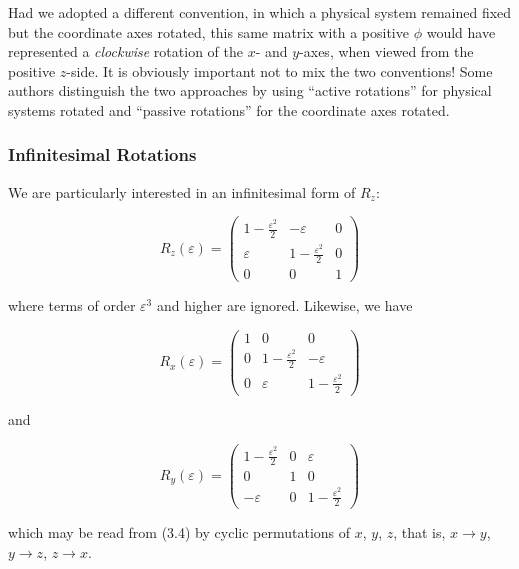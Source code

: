 \documentclass[11pt,a4paper]{article}
\begin{document}
Had we adopted a different convention, in which a physical system remained fixed but the coordinate axes rotated, this same matrix with a positive $\phi$ would have represented a \textit{clockwise} rotation of the $x$- and $y$-axes, when viewed from the positive $z$-side. It is obviously important not to mix the two conventions! Some authors distinguish the two approaches by using ``active rotations'' for physical systems rotated and ``passive rotations'' for the coordinate axes rotated.

\subsubsection{Infinitesimal Rotations}

We are particularly interested in an infinitesimal form of $R_z$:

\begin{equation}
R_z(\varepsilon) = \begin{pmatrix} 1 - \frac{\varepsilon^2}{2} & -\varepsilon & 0 \\ \varepsilon & 1 - \frac{\varepsilon^2}{2} & 0 \\ 0 & 0 & 1 \end{pmatrix}
\tag{3.4}
\end{equation}

where terms of order $\varepsilon^3$ and higher are ignored. Likewise, we have

\begin{equation}
R_x(\varepsilon) = \begin{pmatrix} 1 & 0 & 0 \\ 0 & 1 - \frac{\varepsilon^2}{2} & -\varepsilon \\ 0 & \varepsilon & 1 - \frac{\varepsilon^2}{2} \end{pmatrix}
\tag{3.5a}
\end{equation}

and

\begin{equation}
R_y(\varepsilon) = \begin{pmatrix} 1 - \frac{\varepsilon^2}{2} & 0 & \varepsilon \\ 0 & 1 & 0 \\ -\varepsilon & 0 & 1 - \frac{\varepsilon^2}{2} \end{pmatrix}
\tag{3.5b}
\end{equation}

which may be read from (3.4) by cyclic permutations of $x$, $y$, $z$, that is, $x \to y$, $y \to z$, $z \to x$.
\end{document}
